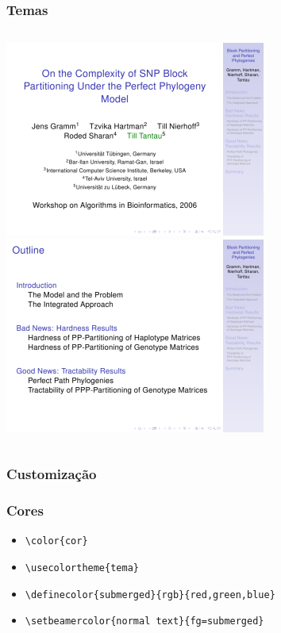 \documentclass{beamer}
\newcommand{\kw}[1]{\textbackslash {\color{submerged}#1}}
\begin{document}
\begin{frame}
   \frametitle{Temas}
   \begin{columns}
      \includegraphics[width=0.45\paperwidth]{imagens/Goettingen01.png}
      \includegraphics[width=0.45\paperwidth]{imagens/Goettingen02.png}
   \end{columns}
\end{frame}

\begin{frame}
   \frametitle{Customização}
   \lstset{frame=single}
   
\end{frame}

\begin{frame}
   \frametitle{Cores}
   \begin{itemize}
      \item {\tt{\kw{color}\{cor\}}}
      \item {\tt{\kw{usecolortheme}\{tema\}}}
      \item {\tt{\kw{definecolor}\{submerged\}\{rgb\}\{red,green,blue\}}}
      \item {\tt{\kw{setbeamercolor}\{normal text\}\{fg=submerged\}}}
   \end{itemize}
\end{frame}
\end{document}
